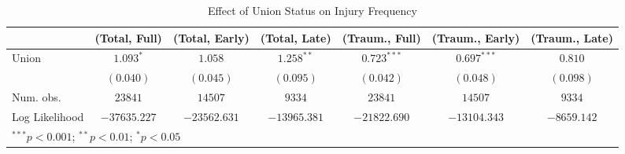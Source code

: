 
\begin{table}
\begin{center}
\begin{tabular}{l c c c c c c}
\hline
 & (Total, Full) & (Total, Early) & (Total, Late) & (Traum., Full) & (Traum., Early) & (Traum., Late) \\
\hline
Union          & $1.093^{*}$  & $1.058$      & $1.258^{**}$ & $0.723^{***}$ & $0.697^{***}$ & $0.810$     \\
               & $(0.040)$    & $(0.045)$    & $(0.095)$    & $(0.042)$     & $(0.048)$     & $(0.098)$   \\
\hline
Num. obs.      & $23841$      & $14507$      & $9334$       & $23841$       & $14507$       & $9334$      \\
Log Likelihood & $-37635.227$ & $-23562.631$ & $-13965.381$ & $-21822.690$  & $-13104.343$  & $-8659.142$ \\
\hline
\multicolumn{7}{l}{\scriptsize{$^{***}p<0.001$; $^{**}p<0.01$; $^{*}p<0.05$}}
\end{tabular}
\caption{Effect of Union Status on Injury Frequency}
\label{irr_100employees_injuries}
\end{center}
\end{table}

